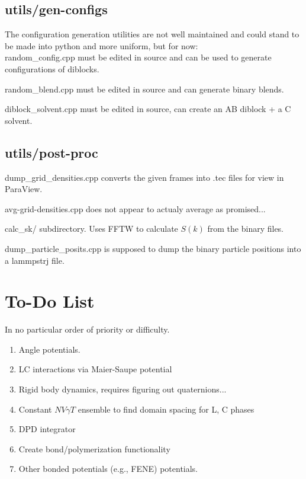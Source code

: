 \documentclass[12pt]{article}
\begin{document}
\subsection{utils/gen-configs}
The configuration generation utilities are not well maintained and could stand to be made into python and more uniform, but for now:
\\
random\_config.cpp must be edited in source and can be used to generate configurations of diblocks.

random\_blend.cpp must be edited in source and can generate binary blends.

diblock\_solvent.cpp must be edited in source, can create an AB diblock + a C solvent. 


\subsection{utils/post-proc}
dump\_grid\_densities.cpp converts the given frames into .tec files for view in ParaView.

avg-grid-densities.cpp does not appear to actualy average as promised...

calc\_sk/ subdirectory. Uses FFTW to calculate $S(k)$ from the binary files.

dump\_particle\_posits.cpp is supposed to dump the binary particle positions into a lammpstrj file.









\pagebreak
\section{To-Do List}
In no particular order of priority or difficulty.

\begin{enumerate}
	
	
	\item
	Angle potentials. 	

	\item
	LC interactions via Maier-Saupe potential
	
	\item
	Rigid body dynamics, requires figuring out quaternions...
	
	\item
	Constant $NV\gamma T$ ensemble to find domain spacing for L, C phases
	
	\item
	DPD integrator
		
	\item
	Create bond/polymerization functionality
	
	\item
	Other bonded potentials (e.g., FENE) potentials.
	
	
\end{enumerate}
\end{document}

